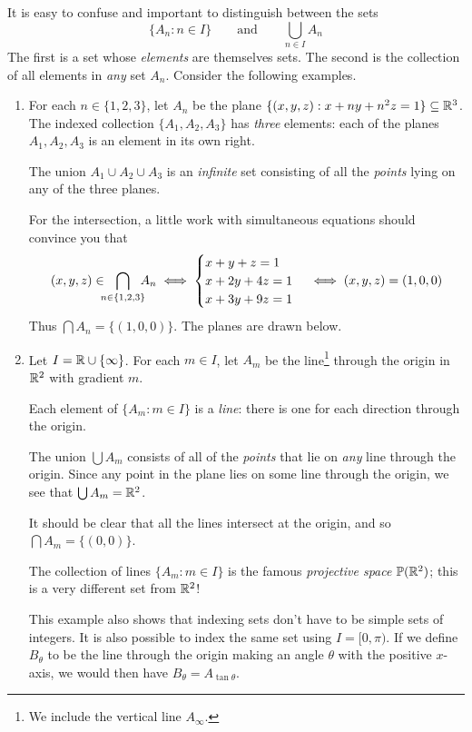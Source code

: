 It is easy to confuse and important to distinguish between the sets
\[
	\{A_n:n\in I\}\qquad\text{and}\qquad\bigcup_{n\in I}A_n
\]
The first is a set whose \emph{elements} are themselves sets. The second is the collection of all elements in \emph{any} set $A_n$. Consider the following examples.


\begin{examples}{}{}
	\begin{enumerate}
		\item For each $n\in\{1,2,3\}$, let $A_n$ be the plane $\{(x,y,z):x+ny+n^2z=1\}\subseteq\mathbb{R}^3$.\\[2pt]
		The indexed collection $\{A_1,A_2,A_3\}$ has \emph{three} elements: each of the planes $A_1,A_2,A_3$ is an element in its own right.\par
	  The union $A_1\cup A_2\cup A_3$ is an \emph{infinite} set consisting of all the \emph{points} lying on any of the three planes.\par
	  For the intersection, a little work with simultaneous equations should convince you that
	  \[
	  	(x,y,z)\in\negthickspace\negthickspace\bigcap_{n\in\{1,2,3\}}\negthickspace\negthickspace A_n\iff
	  	\begin{cases}
	  		x+y+z=1\\
	  		x+2y+4z=1\\
	  		x+3y+9z=1
	  	\end{cases}
	  	\iff (x,y,z)=(1,0,0)
	  \]
	  Thus $\bigcap A_n=\{(1,0,0)\}$. The planes are drawn below.
  
  	\item\label{ex:projline} Let $I=\mathbb{R}\cup\{\infty\}$. For each $m\in I$, let $A_m$ be the line\footnote{We include the vertical line $A_\infty$.} through the origin in $\mathbb{R}^2$ with gradient $m$.\par
  	Each element of $\{A_m:m\in I\}$ is a \emph{line}: there is one for each direction through the origin.\par
  	The union $\bigcup A_m$ consists of all of the \emph{points} that lie on \emph{any} line through the origin. Since any point in the plane lies on some line through the origin, we see that $\bigcup A_m=\mathbb{R}^2$.\par
  	It should be clear that all the lines intersect at the origin, and so $\bigcap A_m=\{(0,0)\}$.\par
  	The collection of lines $\{A_m:m\in I\}$ is the famous \emph{projective space} $\mathbb P(\mathbb{R}^2)$; this is a very different set from $\mathbb{R}^2$!\par
  	This example also shows that indexing sets don't have to be simple sets of integers. It is also possible to index the same set using $I=[0,\pi)$. If we define $B_\theta$ to be the line through the origin making an angle $\theta$ with the positive $x$-axis, we would then have $B_\theta=A_{\tan\theta}$.
	\end{enumerate}
\end{examples}

